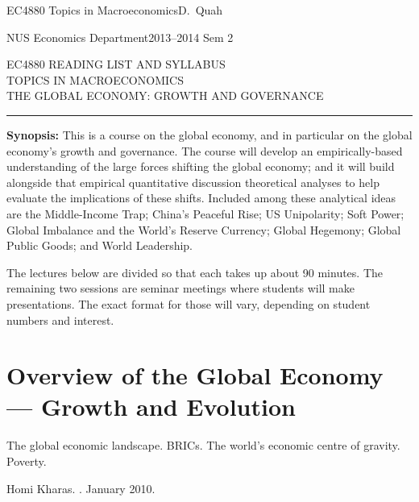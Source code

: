 \documentclass[%
 11pt%
]{article}
\begin{document}
\noindent EC4880 Topics in Macroeconomics\hfill  D.~Quah

\noindent NUS Economics Department\hfill 2013--2014 Sem 2

\bigskip
\begin{center}
EC4880 READING LIST AND SYLLABUS\\
TOPICS IN MACROECONOMICS\\
THE GLOBAL ECONOMY:  GROWTH AND GOVERNANCE
\end{center}

\medskip
\hrule
\bigskip

\thispagestyle{empty}

\noindent \textbf{Synopsis:}  This is a course on the global economy,
and in particular on the global economy's growth and governance. The
course will develop an empirically-based understanding of the large
forces shifting the global economy; and it will build alongside that
empirical quantitative discussion theoretical analyses to help
evaluate the implications of these shifts.  Included among these
analytical ideas are the Middle-Income Trap; China's Peaceful Rise; US
Unipolarity; Soft Power; Global Imbalance and the World's Reserve
Currency; Global Hegemony; Global Public Goods; and World Leadership.

The lectures below are divided so that each takes up about 90 minutes.
The remaining two sessions are seminar meetings where students will
make presentations.  The exact format for those will vary, depending
on student numbers and interest.

\raggedright
\setlength{\parindent}{-0.3cm}

\section{Overview of the Global Economy --- Growth and Evolution}

The global economic landscape.  BRICs.  The world's economic centre of
gravity.  Poverty.

\bigskip

\nocite{Quah-D-Global-Economy-Shifting-Centre-of-Gravity-2011}
\nocite{Chen-S+Ravallion-M-Poorer-QJE-2010}
\nocite{Kharas-H-Emerging-Middle-Class-2010}
\nocite{Dollar-D-Kleineberg-T-Kraay-A-Growth-Is-Still-Good-For-The-Poor-2013}
\nocite{Sala-i-Martin-X-World-Distribution-of-Income-2006}

Homi Kharas.
.
\newblock January 2010.
\medskip
\end{document}
